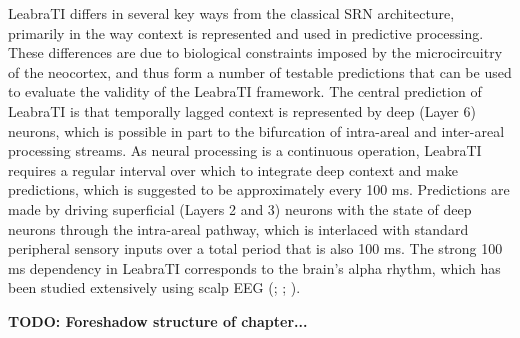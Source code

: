 \documentclass[dwyatte_dissertation.tex]{subfiles}
\begin{document}
LeabraTI differs in several key ways from the classical SRN architecture, primarily in the way context is represented and used in predictive processing. These differences are due to biological constraints imposed by the microcircuitry of the neocortex, and thus form a number of testable predictions that can be used to evaluate the validity of the LeabraTI framework. The central prediction of LeabraTI is that temporally lagged context is represented by deep (Layer 6) neurons, which is possible in part to the bifurcation of intra-areal and inter-areal processing streams. As neural processing is a continuous operation, LeabraTI requires a regular interval over which to integrate deep context and make predictions, which is suggested to be approximately every 100 ms. Predictions are made by driving superficial (Layers 2 and 3) neurons with the state of deep neurons through the intra-areal pathway, which is interlaced with standard peripheral sensory inputs over a total period that is also 100 ms. The strong 100 ms dependency in LeabraTI corresponds to the brain's alpha rhythm, which has been studied extensively using scalp EEG (; ; ). 

\textbf{TODO: Foreshadow structure of chapter...}
\end{document}
